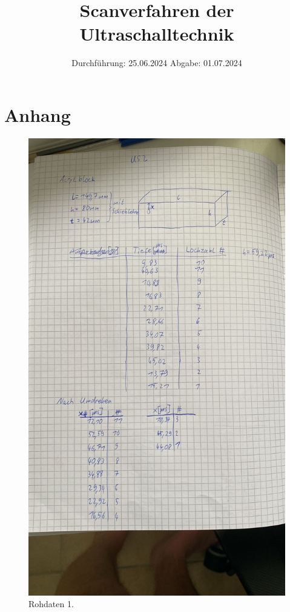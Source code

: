 

\subject{VUS2}
\title{Scanverfahren der Ultraschalltechnik}
\date{%
  Durchführung: 25.06.2024
  \hspace{3em}
  Abgabe: 01.07.2024
}



\maketitle
\thispagestyle{empty}
\tableofcontents
\newpage

%
%

%

\printbibliography{}

\section{Anhang}
\begin{figure}[H]
  \includegraphics[width=\textwidth]{Bilder/messdaten1.jpg}
  \caption{Rohdaten 1.}
  \label{fig:1}
\end{figure}

